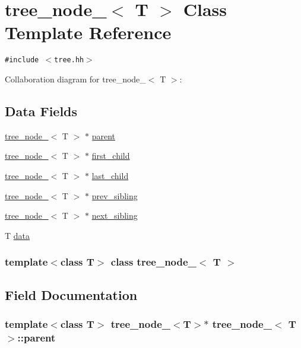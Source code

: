 \hypertarget{classtree__node__}{
\section{tree\_\-node\_\-$<$ T $>$ Class Template Reference}
\label{classtree__node__}
}
{\tt \#include $<$tree.hh$>$}

Collaboration diagram for tree\_\-node\_\-$<$ T $>$:\subsection*{Data Fields}
\begin{CompactItemize}
\item 
\hyperlink{classtree__node__}{tree\_\-node\_\-}$<$ T $>$ $\ast$ \hyperlink{classtree__node___60597bf2f8288fdd616c52f8a5a4e477}{parent}
\item 
\hyperlink{classtree__node__}{tree\_\-node\_\-}$<$ T $>$ $\ast$ \hyperlink{classtree__node___d51591496e654515b662095f70d1fc1a}{first\_\-child}
\item 
\hyperlink{classtree__node__}{tree\_\-node\_\-}$<$ T $>$ $\ast$ \hyperlink{classtree__node___611d3c41c716dae6bf2012e3d9152933}{last\_\-child}
\item 
\hyperlink{classtree__node__}{tree\_\-node\_\-}$<$ T $>$ $\ast$ \hyperlink{classtree__node___e7b8325f91c0b4460552cef6b9aec159}{prev\_\-sibling}
\item 
\hyperlink{classtree__node__}{tree\_\-node\_\-}$<$ T $>$ $\ast$ \hyperlink{classtree__node___195a647282d6ab1de50d9ac87aa42bce}{next\_\-sibling}
\item 
T \hyperlink{classtree__node___4c15077a3ad0552413d1268ee4be1bef}{data}
\end{CompactItemize}
\subsubsection*{template$<$class T$>$ class tree\_\-node\_\-$<$ T $>$}



\subsection{Field Documentation}
\hypertarget{classtree__node___60597bf2f8288fdd616c52f8a5a4e477}{
\subsubsection{\setlength{\rightskip}{0pt plus 5cm}template$<$class T$>$ {\bf tree\_\-node\_\-}$<$T$>$$\ast$ {\bf tree\_\-node\_\-}$<$ T $>$::{\bf parent}}}
\label{classtree__node___60597bf2f8288fdd616c52f8a5a4e477}


